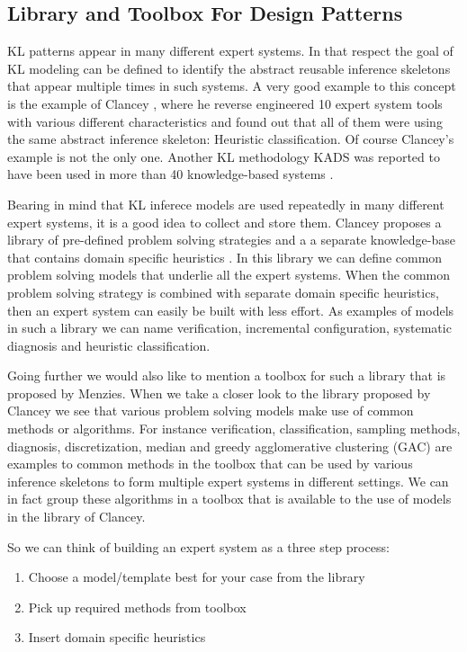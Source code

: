 \documentclass[conference]{IEEEtran}
\begin{document}
\subsection{Library and Toolbox For Design Patterns}
\label{section:library}
KL patterns appear in many different expert systems.
In that respect the goal of KL modeling can be defined to identify the abstract reusable inference skeletons that appear multiple times in such systems.
A very good example to this concept is the example of Clancey \cite{Clancey1985}, where he reverse engineered 10 expert system tools with various different characteristics and found out that all of them were using the same abstract inference skeleton: Heuristic classification.
Of course Clancey's example is not the only one.
Another KL methodology KADS \cite{Wielinga1992} was reported to have been used in more than 40 knowledge-based systems \cite{Menzies97object-orientedpatterns:}.

Bearing in mind that KL inferece models are used repeatedly in many different expert systems, it is a good idea to collect and store them.
Clancey proposes a library of pre-defined problem solving strategies and a a separate knowledge-base that contains domain specific heuristics \cite{Wielinga1992}.
In this library we can define common problem solving models that underlie all the expert systems.
When the common problem solving strategy is combined with separate domain specific heuristics, then an expert system can easily be built with less effort.
As examples of models in such a library we can name verification, incremental configuration, systematic diagnosis and heuristic classification.

Going further we would also like to mention a toolbox for such a library that is proposed by Menzies\cite{Menzies2009}.
When we take a closer look to the library proposed by Clancey \cite{Wielinga1992} we see that various problem solving models make use of common methods or algorithms.
For instance verification, classification, sampling methods, diagnosis, discretization, median and greedy agglomerative clustering (GAC) are examples to common methods in the toolbox that can be used by various inference skeletons to form multiple expert systems in different settings.
We can in fact group these algorithms in a toolbox that is available to the use of models in the library of Clancey.

So we can think of building an expert system as a three step process:
\begin{enumerate}
\item Choose a model/template best for your case from the library
\item Pick up required methods from toolbox
\item Insert domain specific heuristics
\end{enumerate}
\end{document}
